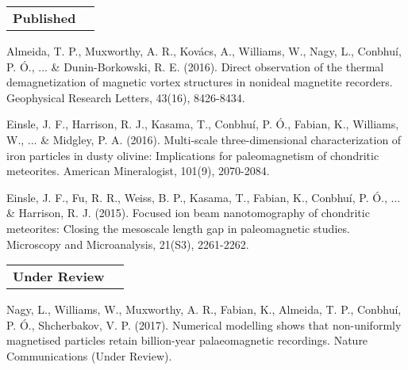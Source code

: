 \documentclass[11pt]{article}
\makeatletter
\newenvironment{resumeSubSectionHeader}{
    \par
    \begin{tabular*}{\textwidth}{l@{\extracolsep{\fill}}r}
    \par
} {
    \end{tabular*}
    \par
}
\newenvironment{resumeSubSectionBody}{
    \par
    \vspace{-0.8\parskip}
    \begin{small}
    \par
} {
    \par
    \end{small}
    \par
}
\makeatother
\begin{document}
%
%
\begin{resumeSubSectionHeader}

    \textbf{Published}

\end{resumeSubSectionHeader}
\begin{resumeSubSectionBody}

    Almeida, T. P., Muxworthy, A. R., Kov\'acs, A., Williams, W., Nagy, L.,
    Conbhu\'i, P. \'O., ... {\&} Dunin-Borkowski, R. E. (2016). Direct
    observation of the thermal demagnetization of magnetic vortex structures in
    nonideal magnetite recorders. Geophysical Research Letters, 43(16),
    8426-8434.

    Einsle, J. F., Harrison, R. J., Kasama, T., Conbhu\'i, P. \'O., Fabian, K.,
    Williams, W., ... {\&} Midgley, P. A. (2016). Multi-scale three-dimensional
    characterization of iron particles in dusty olivine: Implications for
    paleomagnetism of chondritic meteorites. American Mineralogist, 101(9),
    2070-2084.

    Einsle, J. F., Fu, R. R., Weiss, B. P., Kasama, T., Fabian, K., Conbhu\'i,
    P.  \'O., ... {\&} Harrison, R. J. (2015). Focused ion beam nanotomography
    of chondritic meteorites: Closing the mesoscale length gap in paleomagnetic
    studies. Microscopy and Microanalysis, 21(S3), 2261-2262.

\end{resumeSubSectionBody}


%
%
\begin{resumeSubSectionHeader}

    \textbf{Under Review}

\end{resumeSubSectionHeader}
\begin{resumeSubSectionBody}

    Nagy, L., Williams, W., Muxworthy, A. R., Fabian, K., Almeida, T. P.,
    Conbhu\'i, P. \'O., Shcherbakov, V. P. (2017). Numerical modelling shows
    that non-uniformly magnetised particles retain billion-year palaeomagnetic
    recordings. Nature Communications (Under Review).

\end{resumeSubSectionBody}
\end{document}
